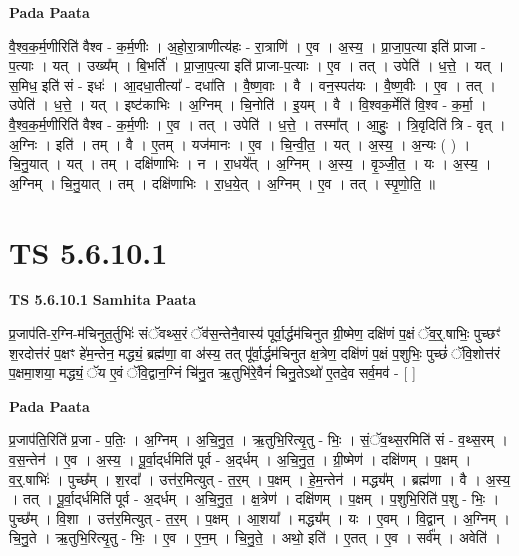 \documentclass[17pt]{extarticle}
\begin{document}
\textbf{Pada Paata} \newline

वै॒श्व॒क॒र्म॒णीरिति॑ वैश्व - क॒र्म॒णीः । अ॒हो॒रा॒त्राणीत्य॑हः - रा॒त्राणि॑ । ए॒व । अ॒स्य॒ । प्रा॒जा॒प॒त्या इति॑ प्राजा - प॒त्याः । यत् । उख्य᳚म् । बि॒भर्ति॑ । प्रा॒जा॒प॒त्या इति॑ प्राजा-प॒त्याः । ए॒व । तत् । उपेति॑ । ध॒त्ते॒ । यत् । स॒मिध॒ इति॑ सं - इधः॑ । आ॒दधा॒तीत्या᳚ - दधा॑ति । वै॒ष्ण॒वाः । वै । वन॒स्पत॑यः । वै॒ष्ण॒वीः । ए॒व । तत् । उपेति॑ । ध॒त्ते॒ । यत् । इष्ट॑काभिः । अ॒ग्निम् । चि॒नोति॑ । इ॒यम् । वै । वि॒श्वक॒र्मेति॑ वि॒श्व - क॒र्मा॒ । वै॒श्व॒क॒र्म॒णीरिति॑ वैश्व - क॒र्म॒णीः । ए॒व । तत् । उपेति॑ । ध॒त्ते॒ । तस्मा᳚त् । आ॒हुः॒ । त्रि॒वृदिति॑ त्रि - वृत् । अ॒ग्निः । इति॑ । तम् । वै । ए॒तम् । यज॑मानः । ए॒व । चि॒न्वी॒त॒ । यत् । अ॒स्य॒ । अ॒न्यः ( ) । चि॒नु॒यात् । यत् । तम् । दक्षि॑णाभिः । न । रा॒धये᳚त् । अ॒ग्निम् । अ॒स्य॒ । वृ॒ञ्जी॒त॒ । यः । अ॒स्य॒ । अ॒ग्निम् । चि॒नु॒यात् । तम् । दक्षि॑णाभिः । रा॒ध॒ये॒त् । अ॒ग्निम् । ए॒व । तत् । स्पृ॒णो॒ति॒ ॥  \newline





\section{ TS 5.6.10.1 }

\textbf{TS 5.6.10.1 } \newline
\textbf{Samhita Paata} \newline

प्र॒जाप॑ति-र॒ग्नि-म॑चिनुत॒र्तुभिः॑ संॅवथ्स॒रं ॅव॑स॒न्तेनै॒वास्य॑ पूर्वा॒र्द्धम॑चिनुत ग्री॒ष्मेण॒ दक्षि॑णं प॒क्षं ॅव॒र्॒.षाभिः॒ पुच्छꣳ॑ श॒रदोत्त॑रं प॒क्षꣳ हे॑म॒न्तेन॒ मद्ध्यं॒ ब्रह्म॑णा॒ वा अ॑स्य॒ तत् पू᳚र्वा॒र्द्धम॑चिनुत क्ष॒त्रेण॒ दक्षि॑णं प॒क्षं प॒शुभिः॒ पुच्छं॑ ॅवि॒शोत्त॑रं प॒क्षमा॒शया॒ मद्ध्यं॒ ॅय ए॒वं ॅवि॒द्वान॒ग्निं चि॑नु॒त ऋ॒तुभि॑रे॒वैनं॑ चिनु॒तेऽथो॑ ए॒तदे॒व सर्व॒मव॑ - [  ] \newline

\textbf{Pada Paata} \newline

प्र॒जाप॑ति॒रिति॑ प्र॒जा - प॒तिः॒ । अ॒ग्निम् । अ॒चि॒नु॒त॒ । ऋ॒तुभि॒रित्यृ॒तु - भिः॒ । सं॒ॅव॒थ्स॒रमिति॑ सं - व॒थ्स॒रम् । व॒स॒न्तेन॑ । ए॒व । अ॒स्य॒ । पू॒र्वा॒द्‌र्धमिति॑ पूर्व - अ॒द्‌र्धम् । अ॒चि॒नु॒त॒ । ग्री॒ष्मेण॑ । दक्षि॑णम् । प॒क्षम् । व॒र्॒.षाभिः॑ । पुच्छ᳚म् । श॒रदा᳚ । उत्त॑र॒मित्युत् - त॒र॒म् । प॒क्षम् । हे॒म॒न्तेन॑ । मद्ध्य᳚म् । ब्रह्म॑णा । वै । अ॒स्य॒ । तत् । पू॒र्वा॒द्‌र्धमिति॑ पूर्व - अ॒द्‌र्धम् । अ॒चि॒नु॒त॒ । क्ष॒त्रेण॑ । दक्षि॑णम् । प॒क्षम् । प॒शुभि॒रिति॑ प॒शु - भिः॒ । पुच्छ᳚म् । वि॒शा । उत्त॑र॒मित्युत् - त॒र॒म् । प॒क्षम् । आ॒शया᳚ । मद्ध्य᳚म् । यः । ए॒वम् । वि॒द्वान् । अ॒ग्निम् । चि॒नु॒ते । ऋ॒तुभि॒रित्यृ॒तु - भिः॒ । ए॒व । ए॒न॒म् । चि॒नु॒ते॒ । अथो॒ इति॑ । ए॒तत् । ए॒व । सर्व᳚म् । अवेति॑ ।  \newline
\end{document}
